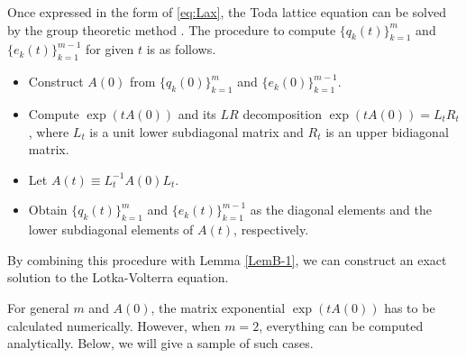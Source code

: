 \documentclass[pdflatex,sn-mathphys-num]{sn-jnl}%
\theoremstyle{thmstyleone}%
\theoremstyle{thmstyletwo}%
\theoremstyle{thmstylethree}%
\begin{document}
\begin{appendices}
Once expressed in the form of \eqref{eq:Lax}, the Toda lattice equation can be solved by the group theoretic method \cite{Kostant79,Nakamura18}. The procedure to compute $\{q_k(t)\}_{k=1}^m$ and $\{e_k(t)\}_{k=1}^{m-1}$ for given $t$ is as follows.
\begin{itemize}
\item[(i)] Construct $A(0)$ from $\{q_k(0)\}_{k=1}^m$ and $\{e_k(0)\}_{k=1}^{m-1}$.
\item[(ii)] Compute $\exp(tA(0))$ and its $LR$ decomposition $\exp(tA(0))=L_t R_t$, where $L_t$ is a unit lower subdiagonal matrix and $R_t$ is an upper bidiagonal matrix.
\item[(iii)] Let $A(t)\equiv L_t^{-1}A(0)L_t$.
\item[(iv)] Obtain $\{q_k(t)\}_{k=1}^m$ and $\{e_k(t)\}_{k=1}^{m-1}$ as the diagonal elements and the lower subdiagonal elements of $A(t)$, respectively.
\end{itemize}
By combining this procedure with Lemma \ref{LemB-1}, we can construct an exact solution to the Lotka-Volterra equation.

For general $m$ and $A(0)$, the matrix exponential $\exp(tA(0))$ has to be calculated numerically. However, when $m=2$, everything can be computed analytically. Below, we will give a sample of such cases.


\end{appendices}
\end{document}
